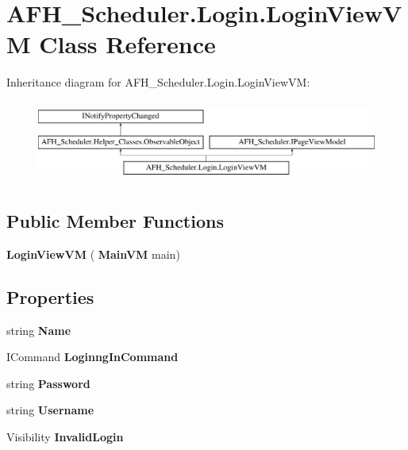 \section{A\+F\+H\+\_\+\+Scheduler.\+Login.\+Login\+View\+VM Class Reference}
\label{class_a_f_h___scheduler_1_1_login_1_1_login_view_v_m}
Inheritance diagram for A\+F\+H\+\_\+\+Scheduler.\+Login.\+Login\+View\+VM\+:\begin{figure}[H]
\begin{center}
\leavevmode
\includegraphics[height=2.700965cm]{class_a_f_h___scheduler_1_1_login_1_1_login_view_v_m}
\end{center}
\end{figure}
\subsection*{Public Member Functions}
\begin{DoxyCompactItemize}
\item 
\mbox{\label{class_a_f_h___scheduler_1_1_login_1_1_login_view_v_m_ae3a79ae500524c59a4d2ba362b2b109a}} 
{\bfseries Login\+View\+VM} (\textbf{ Main\+VM} main)
\end{DoxyCompactItemize}
\subsection*{Properties}
\begin{DoxyCompactItemize}
\item 
\mbox{\label{class_a_f_h___scheduler_1_1_login_1_1_login_view_v_m_a9428506225165c441b4a03b6b84c2f72}} 
string {\bfseries Name}\hspace{0.3cm}{\ttfamily  [get]}
\item 
\mbox{\label{class_a_f_h___scheduler_1_1_login_1_1_login_view_v_m_a5cabff566ac4bc86b5e42f292c8e1e47}} 
I\+Command {\bfseries Loginng\+In\+Command}\hspace{0.3cm}{\ttfamily  [get]}
\item 
\mbox{\label{class_a_f_h___scheduler_1_1_login_1_1_login_view_v_m_a3cc5ee2fba27a49e5e4c2efc77a32a35}} 
string {\bfseries Password}\hspace{0.3cm}{\ttfamily  [get, set]}
\item 
\mbox{\label{class_a_f_h___scheduler_1_1_login_1_1_login_view_v_m_ab70a9835b6267f67a94be6c52928698c}} 
string {\bfseries Username}\hspace{0.3cm}{\ttfamily  [get, set]}
\item 
\mbox{\label{class_a_f_h___scheduler_1_1_login_1_1_login_view_v_m_abb807070ac67b8caa7df9eba9ffaa25a}} 
Visibility {\bfseries Invalid\+Login}\hspace{0.3cm}{\ttfamily  [get, set]}
\end{DoxyCompactItemize}
